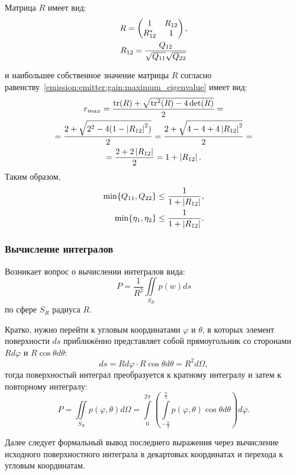 Матрица $R$ имеет вид:
\begin{gather}
    R
    = \begin{pmatrix}
          1        & R_{12} \\
          R_{12}^* & 1
    \end{pmatrix}
    \notag, \\
    R_{12} = \frac{Q_{12}}{\sqrt{Q_{11}} \sqrt{Q_{22}}}
    \label{emission:emitter:efficiency:diagram_intersection}
\end{gather}

и наибольшее собственное значение матрицы $R$ согласно равенству~\eqref{emission:emitter:gain:maximum_eigenvalue} имеет вид:
\begin{multline*}
    r_{max}
    = \frac{\tr(R) + \sqrt{\tr^2(R) - 4 \det(R)}}{2} = \\
%
    = \frac{2 + \sqrt{2^2 - 4 (1 - \modulus{R_{12}}^2)}}{2}
    = \frac{2 + \sqrt{4 - 4 + 4 \modulus{R_{12}}^2}}{2} = \\
%
    = \frac{2 + 2 \modulus{R_{12}}}{2}
    = 1 + \modulus{R_{12}} .
\end{multline*}
Таким образом,
\begin{align*}
    \min \{ Q_{11}, Q_{22} \} & \le \frac{1}{1 + \left | R_{12} \right |} , \\
    \min \{ \eta_1, \eta_2 \} & \le \frac{1}{1 + \left | R_{12} \right |} .
\end{align*}

\subsubsection{Вычисление интегралов}

Возникает вопрос о вычислении интегралов вида:
\[
    P = \frac{1}{R^2} \iint \limits_{S_R} p(w) ds
\]
по сфере $S_R$ радиуса $R$.

Кратко, нужно перейти к угловым координатами $\varphi$ и $\theta$, в которых элемент поверхности $ds$ приближённо представляет собой прямоугольник со сторонами $R d\varphi$
и $R \cos \theta d\theta$:
\[
    ds = R d\varphi \cdot R \cos \theta d\theta = R^2 d\Omega,
\]
тогда поверхностый интеграл преобразуется к кратному интегралу и затем к повторному интегралу:
\[
    P
    = \iint \limits_{S_R} p(\varphi, \theta) d\Omega
    = \int \limits_0^{2 \pi} \left( \int \limits_{-\frac{\pi}{2}}^{\frac{\pi}{2}} p(\varphi, \theta) \cos \theta d\theta \right) d\varphi .
\]

Далее следует формальный вывод последнего выражения через вычисление исходного поверхностного интеграла в декартовых координатах и перехода к угловым координатам.

